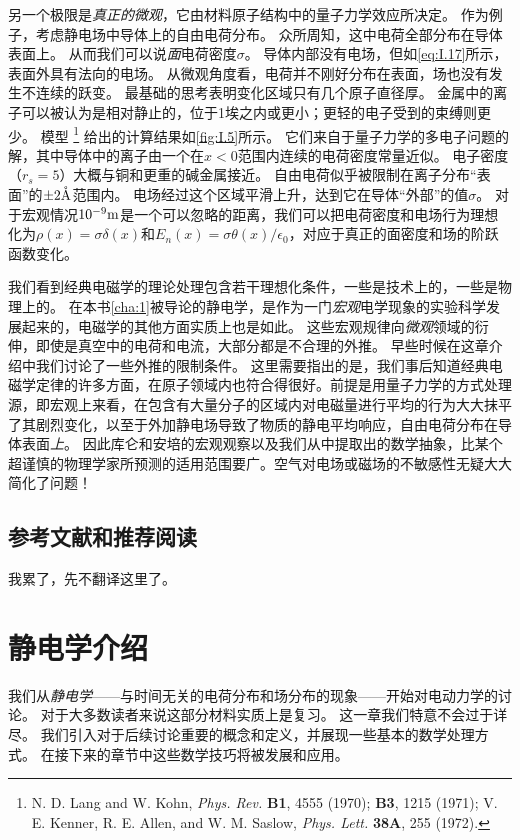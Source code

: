 \documentclass[12pt]{book}
\def\AA{\mathring{\rm A}}
\numberwithin{equation}{chapter}
\numberwithin{figure}{chapter}
\numberwithin{footnote}{page}
\begin{document}
另一个极限是\textit{真正的微观}，它由材料原子结构中的量子力学效应所决定。
作为例子，考虑静电场中导体上的自由电荷分布。
众所周知，这中电荷全部分布在导体表面上。
从而我们可以说\textit{面}电荷密度$\sigma$。
导体内部没有电场，但如\autoref{eq:I.17}所示，表面外具有法向的电场。
从微观角度看，电荷并不刚好分布在表面，场也没有发生不连续的跃变。
最基础的思考表明变化区域只有几个原子直径厚。
金属中的离子可以被认为是相对静止的，位于1埃之内或更小；更轻的电子受到的束缚则更少。
模型
\footnote{N. D. Lang and W. Kohn, \textit{Phys. Rev. }\textbf{B1}, 4555 (1970); \textbf{B3}, 1215 (1971); V. E. Kenner, R. E. Allen, and W. M. Saslow, \textit{Phys. Lett. }\textbf{38A}, 255 (1972). }
给出的计算结果如\autoref{fig:I.5}所示。
它们来自于量子力学的多电子问题的解，其中导体中的离子由一个在$x<0$范围内连续的电荷密度常量近似。
电子密度（$r_s=5$）大概与铜和更重的碱金属接近。
自由电荷似乎被限制在离子分布“表面”的$\pm 2\AA$范围内。
电场经过这个区域平滑上升，达到它在导体“外部”的值$\sigma$。
对于宏观情况$10^{-9}{\rm m}$是一个可以忽略的距离，我们可以把电荷密度和电场行为理想化为$\rho(x)=\sigma\delta(x)$和$E_n(x)=\sigma\theta(x)/\epsilon_0$，对应于真正的面密度和场的阶跃函数变化。

我们看到经典电磁学的理论处理包含若干理想化条件，一些是技术上的，一些是物理上的。
在本书\autoref{cha:1}被导论的静电学，是作为一门\textit{宏观}电学现象的实验科学发展起来的，电磁学的其他方面实质上也是如此。
这些宏观规律向\textit{微观}领域的衍伸，即使是真空中的电荷和电流，大部分都是不合理的外推。
早些时候在这章介绍中我们讨论了一些外推的限制条件。
这里需要指出的是，我们事后知道经典电磁学定律的许多方面，在原子领域内也符合得很好。前提是用量子力学的方式处理源，即宏观上来看，在包含有大量分子的区域内对电磁量进行平均的行为大大抹平了其剧烈变化，以至于外加静电场导致了物质的静电平均响应，自由电荷分布在导体表面\textit{上}。
因此库仑和安培的宏观观察以及我们从中提取出的数学抽象，比某个超谨慎的物理学家所预测的适用范围要广。空气对电场或磁场的不敏感性无疑大大简化了问题！

\section*{参考文献和推荐阅读}\label{sec:I.R}

我累了，先不翻译这里了。

\chapter{静电学介绍}\label{cha:1}

我们从\textit{静电学}——与时间无关的电荷分布和场分布的现象——开始对电动力学的讨论。
对于大多数读者来说这部分材料实质上是复习。
这一章我们特意不会过于详尽。
我们引入对于后续讨论重要的概念和定义，并展现一些基本的数学处理方式。
在接下来的章节中这些数学技巧将被发展和应用。
\end{document}
